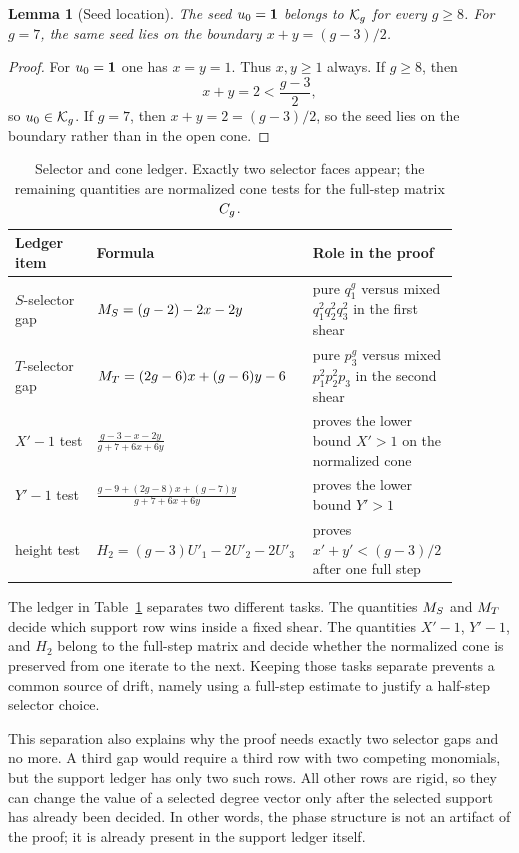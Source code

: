 \documentclass[11pt]{article}
\newtheorem{lemma}[theorem]{Lemma}
\theoremstyle{remark}
\numberwithin{equation}{section}
\begin{document}
\begin{lemma}[Seed location]\label{lem:seed}
The seed \(u_0=\mathbf{1}\) belongs to \(\mathcal{K}_g\) for every \(g\geq 8\).  For \(g=7\),
the same seed lies on the boundary \(x+y=(g-3)/2\).
\end{lemma}

\begin{proof}
For \(u_0=\mathbf{1}\) one has \(x=y=1\).  Thus \(x,y\geq 1\) always.  If \(g\geq 8\),
then
\[
x+y=2<\frac{g-3}{2},
\]
so \(u_0\in\mathcal{K}_g\).  If \(g=7\), then \(x+y=2=(g-3)/2\), so the seed lies on
the boundary rather than in the open cone.
\end{proof}

\begin{table}[t]
\centering
\small
\begin{tabular}{p{0.18\linewidth}p{0.38\linewidth}p{0.32\linewidth}}
\toprule
Ledger item & Formula & Role in the proof \\
\midrule
\(S\)-selector gap & \(M_S=(g-2)-2x-2y\) & pure \(q_1^g\) versus mixed \(q_1^2q_2^2q_3^2\) in the first shear \\
\(T\)-selector gap & \(M_T=(2g-6)x+(g-6)y-6\) & pure \(p_3^g\) versus mixed \(p_1^2p_2^2p_3\) in the second shear \\
\(X'-1\) test & \(\displaystyle \frac{g-3-x-2y}{g+7+6x+6y}\) & proves the lower bound \(X'>1\) on the normalized cone \\
\(Y'-1\) test & \(\displaystyle \frac{g-9+(2g-8)x+(g-7)y}{g+7+6x+6y}\) & proves the lower bound \(Y'>1\) \\
height test & \(H_2=(g-3)U'_1-2U'_2-2U'_3\) & proves \(x'+y'<(g-3)/2\) after one full step \\
\bottomrule
\end{tabular}
\caption{Selector and cone ledger.  Exactly two selector faces appear; the remaining quantities are normalized cone tests for the full-step matrix \(C_g\).}
\label{tab:selector}
\end{table}

The ledger in Table~\ref{tab:selector} separates two different tasks.  The
quantities \(M_S\) and \(M_T\) decide which support row wins inside a fixed
shear.  The quantities \(X'-1\), \(Y'-1\), and \(H_2\) belong to the full-step
matrix and decide whether the normalized cone is preserved from one iterate to
the next.  Keeping those tasks separate prevents a common source of drift,
namely using a full-step estimate to justify a half-step selector choice.

This separation also explains why the proof needs exactly two selector gaps and
no more.  A third gap would require a third row with two competing monomials,
but the support ledger has only two such rows.  All other rows are rigid, so
they can change the value of a selected degree vector only after the selected
support has already been decided.  In other words, the phase structure is not an
artifact of the proof; it is already present in the support ledger itself.
\end{document}
